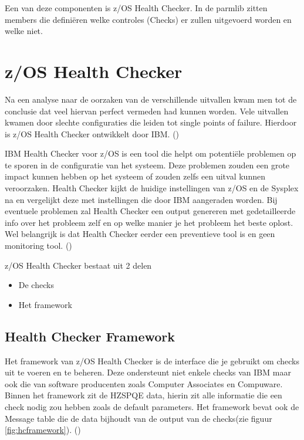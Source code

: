 Een van deze componenten is z/OS Health Checker. In de parmlib zitten members die definiëren welke controles (Checks) er zullen uitgevoerd worden en welke niet.
 
\section{z/OS Health Checker}
\label{sec:z/OS Health Checker}

Na een analyse naar de oorzaken van de verschillende uitvallen kwam men tot de conclusie dat veel hiervan perfect vermeden had kunnen worden. Vele uitvallen kwamen door slechte configuraties die leiden tot single points of failure. Hierdoor is z/OS Health Checker ontwikkelt door IBM. (\cite{Walle2013})

IBM Health Checker voor z/OS is een tool die helpt om potentiële problemen op te sporen in de configuratie van het systeem. Deze problemen zouden een grote impact kunnen hebben op het systeem of zouden zelfs een uitval kunnen veroorzaken. Health Checker kijkt de huidige instellingen van z/OS en de Sysplex na en vergelijkt deze met instellingen die door IBM aangeraden worden. Bij eventuele problemen zal Health Checker een output genereren met gedetailleerde info over het probleem zelf en op welke manier je het probleem het beste oplost. Wel belangrijk is dat Health Checker eerder een preventieve tool is en geen monitoring tool. (\cite{Bezzi2010})

z/OS Health Checker bestaat uit 2 delen
\begin{itemize}
	\item De checks
	\item Het framework	
\end{itemize}

\subsection{Health Checker Framework}
\label{subsec:Health Checker Framework}

Het framework van z/OS Health Checker is de interface die je gebruikt om checks uit te voeren en te beheren. Deze ondersteunt niet enkele checks van IBM maar ook die van software producenten zoals Computer Associates en Compuware. Binnen het framework zit de HZSPQE data, hierin zit alle informatie die een check nodig zou hebben zoals de default parameters.  Het framework bevat ook de Message table die de data bijhoudt van de output van de checks(zie figuur \ref{fig:hcframework}). (\cite{IBMCorporation2019})

